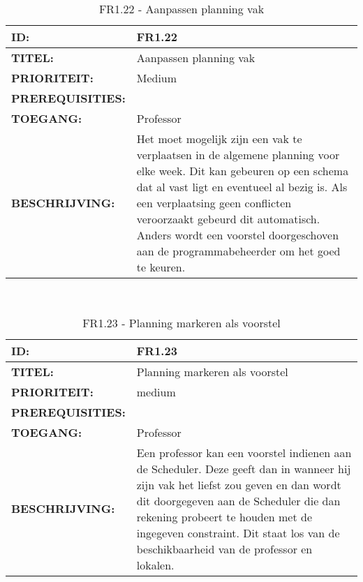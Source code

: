 \noindent\begin{table}[H]
            \begin{tabular}{l | p{10cm}}
                \textbf{ID:} & FR1.22 \\ \hline
                \textbf{TITEL:} & Aanpassen planning vak\\ \hline
                \textbf{PRIORITEIT:} &  Medium \\ \hline
                \textbf{PREREQUISITIES:} & \\ \hline
                \textbf{TOEGANG:} & Professor \\ \hline
                \textbf{BESCHRIJVING:} & Het moet mogelijk  zijn een vak te verplaatsen in de algemene planning voor elke week. Dit kan gebeuren op een schema dat al vast ligt en eventueel al bezig is. Als een verplaatsing geen conflicten veroorzaakt gebeurd dit automatisch. Anders wordt een voorstel doorgeschoven aan de programmabeheerder om het goed te keuren.\\
            \end{tabular}\\
            \caption{FR1.22 - Aanpassen planning vak}
            \label{tab:FR1.22 - Aanpassen planning vak}
        \end{table}
        
\noindent\begin{table}[H]
            \begin{tabular}{l | p{10cm}}
                \textbf{ID:} & FR1.23 \\ \hline
                \textbf{TITEL:} & Planning markeren als voorstel\\ \hline
                \textbf{PRIORITEIT:} &  medium \\ \hline
                \textbf{PREREQUISITIES:} & \\ \hline
                \textbf{TOEGANG:} & Professor \\ \hline
                \textbf{BESCHRIJVING:} & Een professor kan een voorstel indienen aan de Scheduler. 
                                        Deze geeft dan in wanneer hij zijn vak het liefst zou geven en dan wordt dit doorgegeven aan de Scheduler die dan rekening probeert te houden met de ingegeven constraint. Dit staat los van de beschikbaarheid van de professor en lokalen.  \\
            \end{tabular}\\
            \caption{FR1.23 - Planning markeren als voorstel}
            \label{tab:FR1.23 - Planning markeren als voorstel}
        \end{table}

